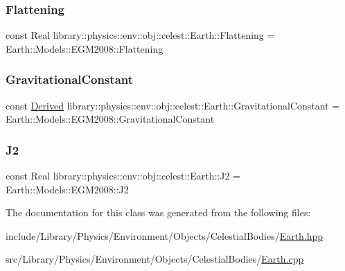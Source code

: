 \subsubsection{\texorpdfstring{Flattening}{Flattening}}
{\footnotesize\ttfamily const Real library\+::physics\+::env\+::obj\+::celest\+::\+Earth\+::\+Flattening = Earth\+::\+Models\+::\+E\+G\+M2008\+::\+Flattening\hspace{0.3cm}{\ttfamily [static]}}

\mbox{\label{classlibrary_1_1physics_1_1env_1_1obj_1_1celest_1_1_earth_a06d0e71a63d0b8e3b85fb8e03d4e9a0d}} 
\subsubsection{\texorpdfstring{Gravitational\+Constant}{GravitationalConstant}}
{\footnotesize\ttfamily const \hyperlink{classlibrary_1_1physics_1_1units_1_1_derived}{Derived} library\+::physics\+::env\+::obj\+::celest\+::\+Earth\+::\+Gravitational\+Constant = Earth\+::\+Models\+::\+E\+G\+M2008\+::\+Gravitational\+Constant\hspace{0.3cm}{\ttfamily [static]}}

\mbox{\label{classlibrary_1_1physics_1_1env_1_1obj_1_1celest_1_1_earth_a1a72d6717f224aad24853666d50fb8a1}} 
\subsubsection{\texorpdfstring{J2}{J2}}
{\footnotesize\ttfamily const Real library\+::physics\+::env\+::obj\+::celest\+::\+Earth\+::\+J2 = Earth\+::\+Models\+::\+E\+G\+M2008\+::\+J2\hspace{0.3cm}{\ttfamily [static]}}



The documentation for this class was generated from the following files\+:\begin{DoxyCompactItemize}
\item 
include/\+Library/\+Physics/\+Environment/\+Objects/\+Celestial\+Bodies/\hyperlink{_earth_8hpp}{Earth.\+hpp}\item 
src/\+Library/\+Physics/\+Environment/\+Objects/\+Celestial\+Bodies/\hyperlink{_earth_8cpp}{Earth.\+cpp}\end{DoxyCompactItemize}
